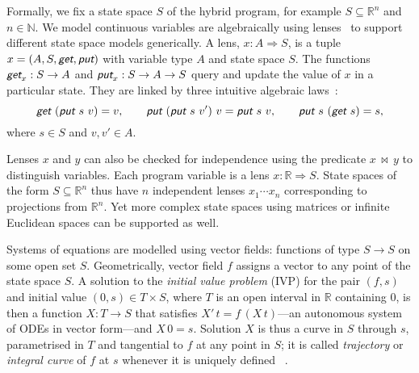 \documentclass[envcountsame,envcountsect]{llncs}
\newcommand{\reals}{\mathbb{R}}
\newcommand{\lput}{\textit{\textsf{put}}}
\newcommand{\lget}{\textit{\textsf{get}}}
\newcommand{\lto}{\Longrightarrow}
\newcommand{\lindep}{\mathop{\,\bowtie\,}}
\begin{document}
Formally, we fix a state space $S$ of the hybrid program, for example
$S\subseteq \reals^n$ and $n\in\mathbb{N}$. We model continuous
variables are algebraically using lenses~\cite{FosterZW16} to support
different state space models generically. A lens, $x : A \lto S$, is a
tuple $x = (A, S, \lget, \lput)$ with variable type $A$ and state
space $S$. The functions $\lget_x : S \to A$ and
$\lput_x : S \to A \to S$ query and update the value of $x$ in a
particular state. They are linked by three intuitive algebraic
laws~\cite{FosterZW16}:
\begin{equation*}
\lget~(\lput~s~v) = v, \qquad \lput~(\lput~s~v')~v = \lput~s~v, \qquad
\lput~s~(\lget~s) = s,
\end{equation*}
where $s \in S$ and $v, v' \in A$.

Lenses $x$ and $y$ can also be checked for independence using the
predicate $x \lindep y$ to distinguish variables. Each program
variable is a lens $x : \reals \lto S$. State spaces of the form
$S \subseteq \reals^n$ thus have $n$ independent lenses
$x_1 \cdots x_n$ corresponding to projections from $\reals^n$. Yet
more complex state spaces using matrices or infinite Euclidean spaces
can be supported as well.

Systems of equations are modelled using vector fields: functions of
type $S\to S$ on some open set $S$. Geometrically, vector field $f$
assigns a vector to any point of the state space $S$. A solution to
the \emph{initial value problem} (IVP) for the pair $(f,s)$ and
initial value $(0,s)\in T\times S$, where $T$ is an open interval in
$\reals$ containing $0$, is then a function $X:T\to S$ that satisfies
$X'\, t = f\, (X\, t)$---an autonomous system of ODEs in vector
form---and $X\, 0 = s$. Solution $X$ is thus a curve in $S$ through
$s$, parametrised in $T$ and tangential to $f$ at any point in $S$; it
is called \emph{trajectory} or \emph{integral curve} of $f$ at $s$
whenever it is uniquely defined ~\cite{Teschl12}.
\end{document}
